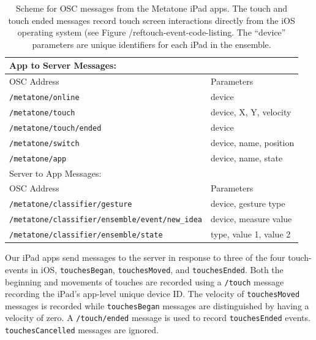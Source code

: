 \documentclass[graybox]{svmult}
\begin{document}
\begin{table}
  \begin{center}
  \begin{tabular}{|l|l|}
  \hline
  App to Server Messages: &\\
  \hline
  OSC Address           & Parameters \\ 
  \hline
  \texttt{/metatone/online}      & device  \\     
  \texttt{/metatone/touch}       & device, X, Y, velocity \\
  \texttt{/metatone/touch/ended} & device \\  
  \texttt{/metatone/switch}      & device, name, position\\
  \texttt{/metatone/app}         & device, name, state\\
  \hline
  Server to App Messages:&\\
  \hline
  OSC Address           & Parameters \\ \hline
  \texttt{/metatone/classifier/gesture} & device, gesture type\\
  \texttt{/metatone/classifier/ensemble/event/new\_idea} & device, measure value\\
  \texttt{/metatone/classifier/ensemble/state} & type, value 1, value 2 \\
  \hline
  \end{tabular}
\end{center}
\caption{Scheme for OSC messages from the Metatone iPad apps. The
  touch and touch ended messages record touch screen interactions
  directly from the iOS operating system (see Figure
  /ref{touch-event-code-listing}. 
  The ``device'' parameters are unique identifiers for each iPad in
  the ensemble.
}
\label{oscschema} 
\end{table}

Our iPad apps send messages to the server in response to three of the
four touch-events in iOS, \texttt{touchesBegan},
\texttt{touchesMoved}, and \texttt{touchesEnded}. Both the beginning
and movements of touches are recorded using a \texttt{/touch} message
recording the iPad's app-level unique device ID. The velocity of
\texttt{touchesMoved} messages is recorded while \texttt{touchesBegan}
messages are distinguished by having a velocity of zero. A
\texttt{/touch/ended} message is used to record \texttt{touchesEnded}
events. \texttt{touchesCancelled} messages are ignored.
 
\end{document}

